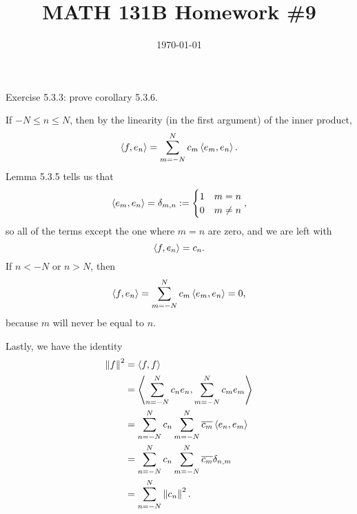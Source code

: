 \documentclass{article}
\date{\today}
\title{MATH 131B Homework \#9}
\begin{document}
\maketitle

\begin{prob}
    Exercise 5.3.3: prove corollary 5.3.6.
\end{prob}
If $-N \leq n \leq N$, then by the linearity (in the first argument) of the inner product,
\[ \left\langle f,e_n \right\rangle = \sum_{m=-N}^N c_m \left\langle e_m,e_n \right\rangle. \]
Lemma 5.3.5 tells us that
\[ \left\langle e_m,e_n \right\rangle = \delta_{m,n} := \begin{cases}
    1 & m=n \\
    0 & m \neq n
\end{cases}, \]
so all of the terms except the one where $m=n$ are zero, and we are left with
\[ \left\langle f,e_n \right\rangle=c_n. \]
If $n<-N$ or $n>N$, then
\[ \left\langle f,e_n \right\rangle = \sum_{m=-N}^N c_m \left\langle e_m,e_n \right\rangle = 0, \]
because $m$ will never be equal to $n$.
\par
Lastly, we have the identity
\begin{align*}
    \left\lVert f\right\rVert^2 &= \left\langle f,f \right\rangle \\
               &= \left\langle \sum_{n=-N}^N c_n e_n , \sum_{m=-N}^N c_m e_m \right\rangle \\
               &= \sum_{n=-N}^N c_n \sum_{m=-N}^N \overline{c_m} \left\langle e_n, e_m \right\rangle \\
               &= \sum_{n=-N}^N c_n \sum_{m=-N}^N \overline{c_m} \delta_{n,m} \\
               &= \sum_{n=-N}^N \left\lVert c_n\right\rVert^2. \\
\end{align*}
\end{document}
